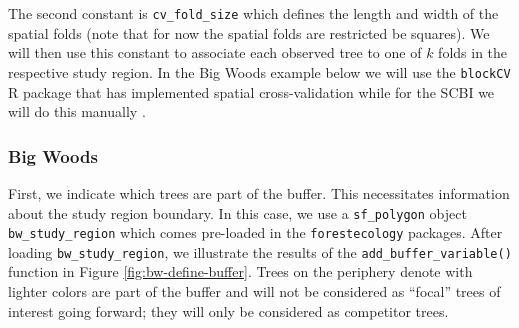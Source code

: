\documentclass[12pt]{article}
\newenvironment{Shaded}{\begin{snugshade}}{\end{snugshade}}
\newcommand{\DataTypeTok}[1]{\textcolor[rgb]{0.13,0.29,0.53}{#1}}
\newcommand{\FloatTok}[1]{\textcolor[rgb]{0.00,0.00,0.81}{#1}}
\newcommand{\KeywordTok}[1]{\textcolor[rgb]{0.13,0.29,0.53}{\textbf{#1}}}
\newcommand{\NormalTok}[1]{#1}
\newcommand{\OperatorTok}[1]{\textcolor[rgb]{0.81,0.36,0.00}{\textbf{#1}}}
\newcommand{\StringTok}[1]{\textcolor[rgb]{0.31,0.60,0.02}{#1}}
\begin{document}
The second constant is \texttt{cv\_fold\_size} which defines the length
and width of the spatial folds (note that for now the spatial folds are
restricted be squares). We will then use this constant to associate each
observed tree to one of \(k\) folds in the respective study region. In
the Big Woods example below we will use the \texttt{blockCV} R package
that has implemented spatial cross-validation while for the SCBI we will
do this manually \citet{valavi2019}.

\hypertarget{big-woods-2}{%
\subsubsection{Big Woods}\label{big-woods-2}}

First, we indicate which trees are part of the buffer. This necessitates
information about the study region boundary. In this case, we use a
\texttt{sf\_polygon} object \texttt{bw\_study\_region} which comes
pre-loaded in the \texttt{forestecology} packages. After loading
\texttt{bw\_study\_region}, we illustrate the results of the
\texttt{add\_buffer\_variable()} function in Figure
\ref{fig:bw-define-buffer}. Trees on the periphery denote with lighter
colors are part of the buffer and will not be considered as ``focal''
trees of interest going forward; they will only be considered as
competitor trees.

\begin{Shaded}
\end{Shaded}
\end{document}
